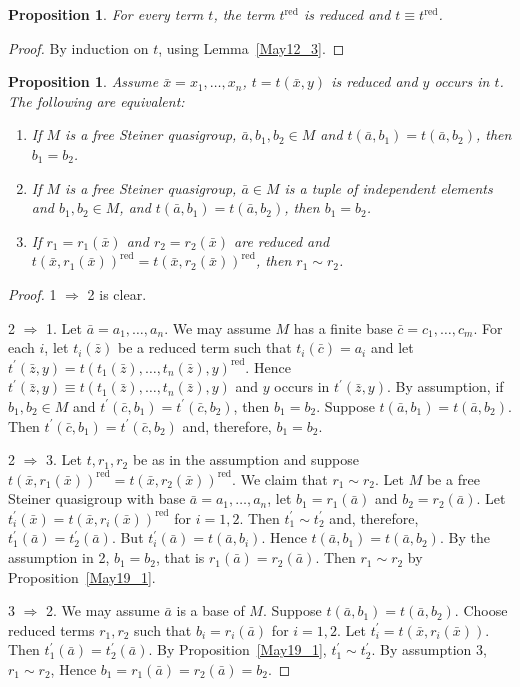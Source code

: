 \documentclass[a4paper, 11pt]{article}
\theoremstyle{note}
\newtheorem{prop}[thm]{Proposition}
\begin{document}
\begin{prop} For every term $t$, the term
	$t^\mathrm{red}$ is reduced and $t\equiv t^\mathrm{red}$.
\end{prop}
\begin{proof}
	By induction on $t$, using Lemma~\ref{May12_3}.
\end{proof}

\begin{prop}\label{fin}
	Assume $\bar{x}=x_1,\ldots,x_n$, $t=t(\bar{x},y)$ is reduced  and  $y$ occurs in $t$. The following are equivalent:
	\begin{enumerate}
		\item If  $M$ is a free Steiner quasigroup,  $\bar{a},b_1,b_2\in M$  and  $t(\bar{a},b_1)= t(\bar{a},b_2)$, then $b_1= b_2$.
		\item If $M$ is a free Steiner quasigroup, $\bar{a}\in M$ is a tuple of independent elements and $b_1,b_2\in M$,  and $t(\bar{a},b_1)= t(\bar{a},b_2)$, then $b_1= b_2$.
		\item If $r_1=r_1(\bar{x})$ and  $r_2= r_2(\bar{x})$  are reduced and  $t(\bar{x},r_1(\bar{x}))^\mathrm{red}= t(\bar{x},r_2(\bar{x}))^\mathrm{red}$, then $r_1\sim r_2$.
	\end{enumerate}
\end{prop}
\begin{proof}
	1 $\Rightarrow$ 2 is clear. 
	
	2 $\Rightarrow$ 1.  Let $\bar{a}= a_1,\ldots,a_n$.  We may assume $M$ has a finite base  $\bar{c}= c_1,\ldots,c_m$.  For each $i$, let  $t_i(\bar{z})$ be a reduced term such that $t_i(\bar{c})= a_i$  and let  $t^\prime(\bar{z},y)= t(t_1(\bar{z}),\ldots,t_n(\bar{z}),y)^\mathrm{red}$. Hence $t^\prime(\bar{z},y)\equiv t(t_1(\bar{z}),\ldots,t_n(\bar{z}),y)$  and $y$ occurs in $t^\prime(\bar{z},y)$. By assumption,  if $b_1,b_2\in M$ and  $t^\prime(\bar{c},b_1)= t^\prime(\bar{c},b_2)$, then $b_1=b_2$. Suppose $t(\bar{a},b_1)=t(\bar{a},b_2)$. Then  $t^\prime(\bar{c},b_1)= t^\prime(\bar{c},b_2)$  and, therefore, $b_1=b_2$.
	
	2 $\Rightarrow$ 3.  Let $t,r_1,r_2$ be as in the assumption and suppose $t(\bar{x},r_1(\bar{x}))^\mathrm{red}= t(\bar{x},r_2(\bar{x}))^\mathrm{red}$. We claim that $r_1\sim r_2$.  Let $M$ be a free Steiner quasigroup  with base $\bar{a}= a_1,\ldots,a_n$, let $b_1= r_1(\bar{a})$ and $b_2 = r_2(\bar{a})$. Let $t_i^\prime(\bar{x})= t(\bar{x},r_i(\bar{x}))^\mathrm{red}$  for $i=1,2$. Then $t_1^\prime\sim t_2^\prime$ and, therefore, $t_1^\prime(\bar{a})= t_2^\prime(\bar{a})$. But $t_i^\prime(\bar{a})= t(\bar{a},b_i)$. Hence  $t(\bar{a},b_1)=t(\bar{a},b_2)$. By the assumption in 2, $b_1=b_2$, that is $r_1(\bar{a})=r_2(\bar{a})$. Then  $r_1\sim r_2$ by Proposition~\ref{May19_1}. 
	
	3 $\Rightarrow$ 2. We may assume  $\bar{a}$ is a base of $M$. Suppose $t(\bar{a},b_1)= t(\bar{a},b_2)$.  Choose reduced terms $r_1,r_2$  such that $b_i=r_i(\bar{a})$  for $i=1,2$. Let $t_i^\prime=t(\bar{x},r_i(\bar{x}))$. Then $t_1^\prime(\bar{a})=t_2^\prime(\bar{a})$.  By Proposition~\ref{May19_1}, $t_1^\prime\sim t_2^\prime$. By assumption 3,  $r_1\sim r_2$, Hence  $b_1=r_1(\bar{a}) =r_2(\bar{a})= b_2$.
\end{proof}
\end{document}
